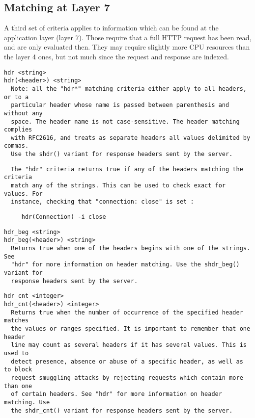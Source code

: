 
\subsection{Matching at Layer 7}

A third set of criteria applies to information which can be found at the
application layer (layer 7). Those require that a full HTTP request has been
read, and are only evaluated then. They may require slightly more CPU resources
than the layer 4 ones, but not much since the request and response are indexed.

\begin{verbatim}
hdr <string>
hdr(<header>) <string>
  Note: all the "hdr*" matching criteria either apply to all headers, or to a
  particular header whose name is passed between parenthesis and without any
  space. The header name is not case-sensitive. The header matching complies
  with RFC2616, and treats as separate headers all values delimited by commas.
  Use the shdr() variant for response headers sent by the server.
\end{verbatim}

\begin{verbatim}
  The "hdr" criteria returns true if any of the headers matching the criteria
  match any of the strings. This can be used to check exact for values. For
  instance, checking that "connection: close" is set :
\end{verbatim}

\begin{verbatim}
     hdr(Connection) -i close
\end{verbatim}

\begin{verbatim}
hdr_beg <string>
hdr_beg(<header>) <string>
  Returns true when one of the headers begins with one of the strings. See
  "hdr" for more information on header matching. Use the shdr_beg() variant for
  response headers sent by the server.
\end{verbatim}

\begin{verbatim}
hdr_cnt <integer>
hdr_cnt(<header>) <integer>
  Returns true when the number of occurrence of the specified header matches
  the values or ranges specified. It is important to remember that one header
  line may count as several headers if it has several values. This is used to
  detect presence, absence or abuse of a specific header, as well as to block
  request smuggling attacks by rejecting requests which contain more than one
  of certain headers. See "hdr" for more information on header matching. Use
  the shdr_cnt() variant for response headers sent by the server.
\end{verbatim}

